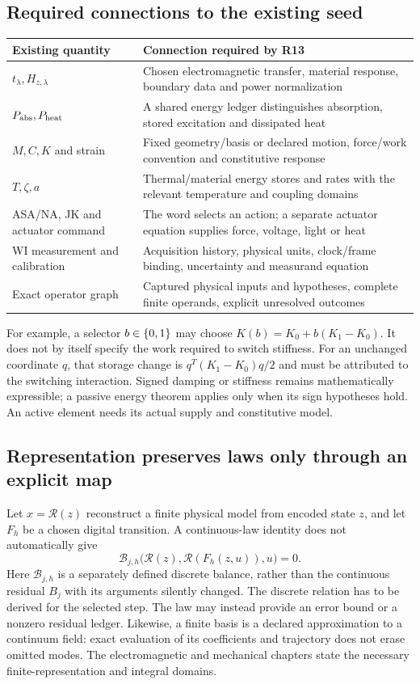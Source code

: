 \subsection{Required connections to the existing seed}
\begin{center}\small
\begin{tabularx}{\linewidth}{@{}P{36mm}Y@{}}
\toprule Existing quantity & Connection required by R13\\\midrule
$t_\lambda,H_{z,\lambda}$ & Chosen electromagnetic transfer, material response, boundary data and power normalization\\
$P_{\rm abs},P_{\rm heat}$ & A shared energy ledger distinguishes absorption, stored excitation and dissipated heat\\
$M,C,K$ and strain & Fixed geometry/basis or declared motion, force/work convention and constitutive response\\
$T,\zeta,a$ & Thermal/material energy stores and rates with the relevant temperature and coupling domains\\
ASA/NA, JK and actuator command & The word selects an action; a separate actuator equation supplies force, voltage, light or heat\\
WI measurement and calibration & Acquisition history, physical units, clock/frame binding, uncertainty and measurand equation\\
Exact operator graph & Captured physical inputs and hypotheses, complete finite operands, explicit unresolved outcomes\\
\bottomrule
\end{tabularx}\end{center}
For example, a selector $b\in\{0,1\}$ may choose
$K(b)=K_0+b(K_1-K_0)$. It does not by itself specify the work required to
switch stiffness. For an unchanged coordinate $q$, that storage change is
$q^T(K_1-K_0)q/2$ and must be attributed to the switching interaction.
Signed damping or stiffness remains mathematically expressible; a passive
energy theorem applies only when its sign hypotheses hold. An active element
needs its actual supply and constitutive model.

\subsection{Representation preserves laws only through an explicit map}
Let $x=\mathcal R(z)$ reconstruct a finite physical model from encoded state
$z$, and let $F_h$ be a chosen digital transition. A continuous-law identity
does not automatically give
\begin{equation}
 \mathcal B_{j,h}\bigl(\mathcal R(z),\mathcal R(F_h(z,u)),u\bigr)=0.
\end{equation}
Here $\mathcal B_{j,h}$ is a separately defined discrete balance, rather than
the continuous residual $B_j$ with its arguments silently changed. The
discrete relation has to be derived for the selected step.
The law may instead provide an error bound or a nonzero residual ledger.
Likewise, a finite basis is a declared approximation to a continuum field:
exact evaluation of its coefficients and trajectory does not erase omitted
modes. The electromagnetic and mechanical chapters state the necessary
finite-representation and integral domains.

